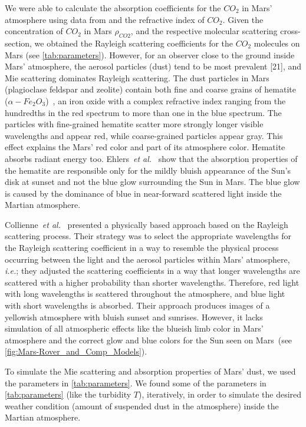 \documentclass[journal]{vgtc}                %
\newcommand{\etal}{\emph{et al.}}
\begin{document}
We were able to calculate the absorption coefficients for the $CO_2$ in Mars' atmosphere using data from \cite{Sneep:2005, Ityaksov:2008} and the refractive index of $CO_2$. 
Given the concentration of $CO_2$ in Mars $\rho_{CO2}$, and the respective molecular scattering cross-section, we obtained the Rayleigh scattering coefficients for the $CO_2$ molecules on Mars (see \autoref{tab:parameters}). However, for an observer close to the ground inside Mars' atmosphere, the aerosol particles (dust) tend to be most prevalent [21], and Mie scattering dominates Rayleigh scattering. The dust particles in Mars (plagioclase feldspar and zeolite) contain both fine and coarse grains of hematite ($\alpha - Fe_2O_3$)~\cite{Christensen:2001}, an iron oxide with a complex refractive index ranging from the hundredths in the red spectrum to more than one in the blue spectrum. The particles with fine-grained hematite scatter more strongly longer visible wavelengths and appear red, while coarse-grained particles appear gray. This effect explains the Mars' red color and part of its atmosphere color. Hematite absorbs radiant energy too. Ehlers~\etal ~\cite{Ehlers:2014} show that the absorption properties of the hematite are responsible only for the mildly bluish appearance of the Sun's disk at sunset and not the blue glow surrounding the Sun in Mars. The blue glow is caused by the dominance of blue in near-forward scattered light inside the Martian atmosphere. 

Collienne~\etal ~\cite{Collienne:2013} presented a physically based approach based on the Rayleigh scattering process. Their strategy was to select the appropriate wavelengths for the Rayleigh scattering coefficient in a way to resemble the physical process occurring between the light and the aerosol particles within Mars' atmosphere, \textit{i.e.}; they adjusted the scattering coefficients in a way that longer wavelengths are scattered with a higher probability than shorter wavelengths. Therefore, red light with long wavelengths is scattered throughout the atmosphere, and blue light with short wavelengths is absorbed. Their approach produces images of a yellowish atmosphere with bluish sunset and sunrises. However, it lacks simulation of all atmospheric effects like the blueish limb color in Mars' atmosphere and the correct glow and blue colors for the Sun seen on Mars~(see \autoref{fig:Mars-Rover_and_Comp_Models}).

To simulate the Mie scattering and absorption properties of Mars' dust, we used the parameters in \autoref{tab:parameters}. We found some of the parameters in \autoref{tab:parameters} (like the turbidity $T$), iteratively, in order to simulate the desired weather condition (amount of suspended dust in the atmosphere) inside the Martian atmosphere.
\end{document}
